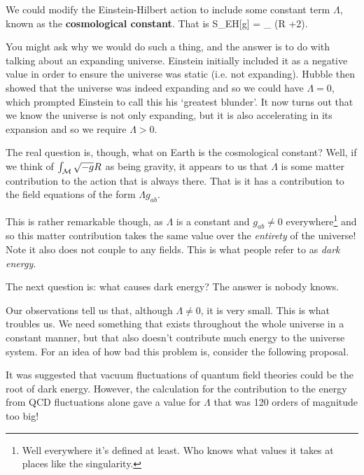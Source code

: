 We could modify the Einstein-Hilbert action to include some constant term $\Lambda$, known as the \textbf{cosmological constant}. That is
\bse 
    S_{EH}[g] = \int_{\cM} (R +2\Lambda).
\ese

You might ask why we would do such a thing, and the answer is to do with talking about an expanding universe. Einstein initially included it as a negative value in order to ensure the universe was static (i.e. not expanding). Hubble then showed that the universe was indeed expanding and so we could have $\Lambda=0$, which prompted Einstein to call this his `greatest blunder'. It now turns out that we know the universe is not only expanding, but it is also accelerating in its expansion and so we require $\Lambda>0$. 

The real question is, though, what on Earth is the cosmological constant? Well, if we think of $\int_{\mathcal{M}}\sqrt{-g}R$ as being gravity, it appears to us that $\Lambda$ is some matter contribution to the action that is always there. That is it has a contribution to the  field equations of the form $\Lambda g_{ab}$. 

This is rather remarkable though, as $\Lambda$ is a constant and $g_{ab}\neq 0$ everywhere\footnote{Well everywhere it's defined at least. Who knows what values it takes at places like the singularity.} and so this matter contribution takes the same value over the \textit{entirety} of the universe! Note it also does not couple to any fields. This is what people refer to as \textit{dark energy}.

The next question is: what causes dark energy? The answer is nobody knows. 

Our observations tell us that, although $\Lambda\neq 0$, it is very small. This is what troubles us. We need something that exists throughout the whole universe in a constant manner, but that also doesn't contribute much energy to the universe system. For an idea of how bad this problem is, consider the following proposal. 

It was suggested that vacuum fluctuations of quantum field theories could be the root of dark energy. However, the calculation for the contribution to the energy from QCD fluctuations alone gave a value for $\Lambda$ that was 120 orders of magnitude too big!